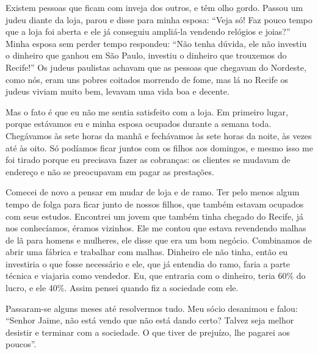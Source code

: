 Existem pessoas que ficam com inveja dos outros, e têm olho gordo. Passou
um judeu diante da loja, parou e disse para minha esposa: ``Veja
só! Faz pouco tempo que a loja foi aberta e ele já conseguiu ampliá-la
vendendo relógios e joias?'' Minha esposa sem perder tempo respondeu:
``Não tenha dúvida, ele não investiu o dinheiro que ganhou em São Paulo,
investiu o dinheiro que trouxemos do Recife!'' Os judeus paulistas achavam que as pessoas que chegavam do Nordeste,
como nós, eram uns pobres coitados morrendo de fome, mas lá no Recife os
judeus viviam muito bem, levavam uma vida boa e decente.

Mas o fato é que eu não me sentia satisfeito com a loja. Em primeiro lugar,
porque estávamos eu e minha esposa ocupados durante a semana toda. Chegávamos às 
sete horas da manhã e fechávamos às sete horas da noite,
às vezes até às oito. Só podíamos ficar juntos com os filhos aos
domingos, e mesmo isso me foi tirado porque eu precisava
fazer as cobranças: os clientes se mudavam de endereço e
não se preocupavam em pagar as prestações.

Comecei de novo a pensar em mudar de loja e de ramo. Ter pelo menos
algum tempo de folga para ficar junto de nossos filhos, que também
estavam ocupados com seus estudos. Encontrei um jovem que também tinha
chegado do Recife, já nos conhecíamos, éramos vizinhos. Ele me contou
que estava revendendo malhas de lã para
homens e mulheres, ele disse que era um bom negócio.
Combinamos de abrir uma fábrica e trabalhar com malhas. Dinheiro ele
não tinha, então eu investiria o que fosse necessário e ele, que já entendia do ramo, faria a parte
técnica e viajaria como vendedor. Eu, que entraria com o dinheiro,
teria 60\% do lucro, e ele 40\%. Assim pensei quando fiz a
sociedade com ele.


Passaram-se alguns meses até resolvermos tudo. Meu sócio desanimou e
falou: ``Senhor Jaime, não está vendo que não está dando certo?
Talvez seja melhor desistir e terminar com a sociedade. O que tiver de
prejuízo, lhe pagarei aos poucos''.

